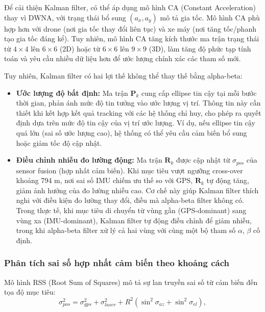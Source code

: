 Để cải thiện Kalman filter, có thể áp dụng mô hình CA (Constant Acceleration) thay vì DWNA, với trạng thái bổ sung $(a_x, a_y)$ mô tả gia tốc. Mô hình CA phù hợp hơn với drone (nơi gia tốc thay đổi liên tục) và xe máy (nơi tăng tốc/phanh tạo gia tốc đáng kể). Tuy nhiên, mô hình CA tăng kích thước ma trận trạng thái từ $4 \times 4$ lên $6 \times 6$ (2D) hoặc từ $6 \times 6$ lên $9 \times 9$ (3D), làm tăng độ phức tạp tính toán và yêu cầu nhiều dữ liệu hơn để ước lượng chính xác các tham số mới.

Tuy nhiên, Kalman filter có hai lợi thế không thể thay thế bằng alpha-beta:

\begin{itemize}
    \item \textbf{Ước lượng độ bất định:} Ma trận $\mathbf{P}_k$ cung cấp ellipse tin cậy tại mỗi bước thời gian, phản ánh mức độ tin tưởng vào ước lượng vị trí. Thông tin này cần thiết khi kết hợp kết quả tracking với các hệ thống chỉ huy, cho phép ra quyết định dựa trên mức độ tin cậy của vị trí ước lượng. Ví dụ, nếu ellipse tin cậy quá lớn (sai số ước lượng cao), hệ thống có thể yêu cầu cảm biến bổ sung hoặc giảm tốc độ cập nhật.

    \item \textbf{Điều chỉnh nhiễu đo lường động:} Ma trận $\mathbf{R}_k$ được cập nhật từ $\sigma_{pos}$ của sensor fusion (hợp nhất cảm biến). Khi mục tiêu vượt ngưỡng cross-over khoảng 794 m, nơi sai số IMU chiếm ưu thế so với GPS, $\mathbf{R}_k$ tự động tăng, giảm ảnh hưởng của đo lường nhiễu cao. Cơ chế này giúp Kalman filter thích nghi với điều kiện đo lường thay đổi, điều mà alpha-beta filter không có. Trong thực tế, khi mục tiêu di chuyển từ vùng gần (GPS-dominant) sang vùng xa (IMU-dominant), Kalman filter tự động điều chỉnh để giảm nhiễu, trong khi alpha-beta filter xử lý cả hai vùng với cùng một bộ tham số $\alpha$, $\beta$ cố định.
\end{itemize}

\subsubsection{Phân tích sai số hợp nhất cảm biến theo khoảng cách}

\hspace{0.5cm} Mô hình RSS (Root Sum of Squares) mô tả sự lan truyền sai số từ cảm biến đến tọa độ mục tiêu:
\begin{equation}
\sigma_{pos}^2 = \sigma_{gps}^2 + \sigma_{laser}^2 + R^2 \left(\sin^2\sigma_{az} + \sin^2\sigma_{el}\right),
\label{eq:rss-fusion}
\end{equation}

